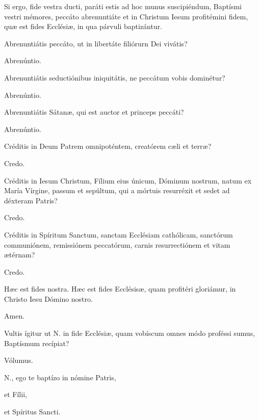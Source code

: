 Si ergo, fide vestra ducti, paráti estis ad hoc munus suscipiéndum, Baptísmi
vestri mémores, peccáto abrenuntiáte et in Christum Iesum profitémini
fidem, quæ est fides Ecclésiæ, in qua párvuli baptizántur.

 Abrenuntiátis peccáto, ut in libertáte filiórurn Dei vivátis?

 Abrenúntio.

 Abrenuntiátis seductiónibus iniquitátis, ne peccátum vobis dominétur?

 Abrenúntio.

 Abrenuntiátis Sátanæ, qui est auctor et princeps peccáti?

 Abrenúntio.


Créditis in Deum Patrem omnipoténtem, creatórem cæli et terræ?

 Credo.

 Créditis in Iesum Christum, Fílium eius únicum, Dóminum nostrum, natum ex
María Vírgine, passum et sepúltum, qui a mórtuis resurréxit et sedet ad déxteram Patris?

 Credo.

 Créditis in Spíritum Sanctum, sanctam Ecclésiam cathólicam,
sanctórum communiónem, remissiónem peccatórum, carnis resurrectiónem et vitam ætérnam?

 Credo.

 Hæc est fides nostra. Hæc est fides Ecclésisæ, quam profitéri gloriámur,
in Christo Iesu Dómino nostro.

 Amen.



Vultis ígitur ut {\color{red}N.} in fide Ecclésiæ, quam vobíscum omnes módo proféssi sumus, Baptísmum recípiat?

 Vólumus.


{\color{red}N.}, ego te baptízo in nómine Patris,


et Fílii,


et Spíritus Sancti.

